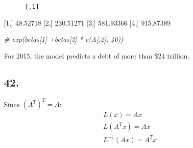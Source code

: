 \documentclass[]{article}
\newenvironment{Shaded}{\begin{snugshade}}{\end{snugshade}}
\newcommand{\CommentTok}[1]{\textcolor[rgb]{0.56,0.35,0.01}{\textit{#1}}}
\newcommand{\DataTypeTok}[1]{\textcolor[rgb]{0.13,0.29,0.53}{#1}}
\newcommand{\DecValTok}[1]{\textcolor[rgb]{0.00,0.00,0.81}{#1}}
\newcommand{\KeywordTok}[1]{\textcolor[rgb]{0.13,0.29,0.53}{\textbf{#1}}}
\newcommand{\NormalTok}[1]{#1}
\newcommand{\OperatorTok}[1]{\textcolor[rgb]{0.81,0.36,0.00}{\textbf{#1}}}
\newcommand{\StringTok}[1]{\textcolor[rgb]{0.31,0.60,0.02}{#1}}
\begin{document}
\begin{Shaded}
\end{Shaded}

\begin{verbatim}
      [,1]
\end{verbatim}

{[}1,{]} 48.52718 {[}2,{]} 230.51271 {[}3,{]} 581.93366 {[}4,{]}
915.87389

\begin{Shaded}
\begin{Highlighting}[]
\CommentTok{# exp(betas[1] +betas[2] * c(A[,2], 40))}
\end{Highlighting}
\end{Shaded}

For 2015, the model predicts a debt of more than \$24 trillion.

\hypertarget{section-21}{%
\subsection{42.}\label{section-21}}

Since \((A^T)^T=A\): \[
  \begin{aligned}
    & L(x) = Ax\\
    & L(A^Tx) = Ax\\
    & L^{-1}(Ax) = A^Tx
  \end{aligned}
\]
\end{document}
